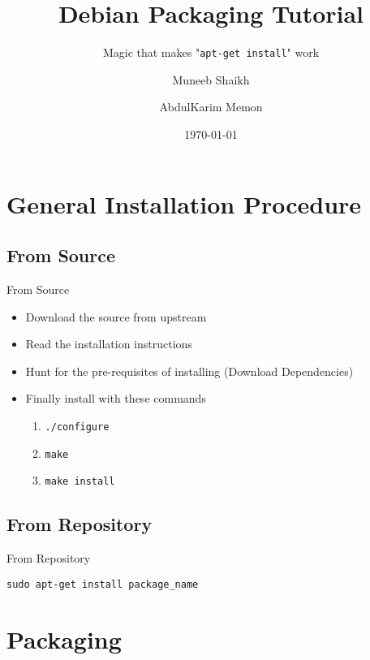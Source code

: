 \documentclass[red,10pt,a4paper]{beamer}
\title{Debian Packaging Tutorial}
\subtitle{Magic that makes "\texttt{apt-get install}" work}
\author[Muneeb, AbdulKarim]{Muneeb Shaikh \and AbdulKarim Memon}
\date{\today}
\begin{document}
\begin{frame}
    \titlepage
\end{frame}





\section{General Installation Procedure}
\subsection{From Source}

\begin{frame}{From Source}
	\begin{itemize}
		\item Download the source from upstream
			\br
		\item Read the installation instructions
			\br
		\item Hunt for the pre-requisites of installing (Download Dependencies)
			\br
		\item Finally install with these commands
			\begin{enumerate}
				\item \texttt{./configure}
					\hbr
				\item \texttt{make}
					\hbr
				\item \texttt{make install}
			\end{enumerate}
	\end{itemize}
\end{frame}

\subsection{From Repository}

\begin{frame}{From Repository}
\begin{center}

\large{\texttt{sudo apt-get install package\_name}}

\end{center}
\end{frame}

\section{Packaging}
\end{document}
